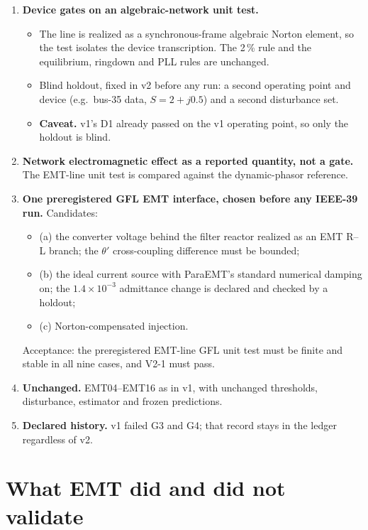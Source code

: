 \documentclass[10pt,a4paper]{article}
\begin{document}
\begin{enumerate}[label=V2-\arabic*.,leftmargin=3em]
\item \textbf{Device gates on an algebraic-network unit test.}
  \begin{itemize}
  \item The line is realized as a synchronous-frame algebraic Norton element,
    so the test isolates the device transcription. The 2\,\% rule and the
    equilibrium, ringdown and PLL rules are unchanged.
  \item Blind holdout, fixed in v2 before any run: a second operating point and
    device (e.g.\ bus-35 data, $S=2+j0.5$) and a second disturbance set.
  \item \textbf{Caveat.} v1's D1 already passed on the v1 operating point, so
    only the holdout is blind.
  \end{itemize}
\item \textbf{Network electromagnetic effect as a reported quantity, not a
  gate.} The EMT-line unit test is compared against the dynamic-phasor
  reference.
\item \textbf{One preregistered GFL EMT interface, chosen before any IEEE-39
  run.} Candidates:
  \begin{itemize}
  \item (a) the converter voltage behind the filter reactor realized as an EMT
    R--L branch; the $\theta'$ cross-coupling difference must be bounded;
  \item (b) the ideal current source with ParaEMT's standard numerical damping
    on; the $1.4\times10^{-3}$ admittance change is declared and checked by a
    holdout;
  \item (c) Norton-compensated injection.
  \end{itemize}
  Acceptance: the preregistered EMT-line GFL unit test must be finite and
  stable in all nine cases, and V2-1 must pass.
\item \textbf{Unchanged.} EMT04--EMT16 as in v1, with unchanged thresholds,
  disturbance, estimator and frozen predictions.
\item \textbf{Declared history.} v1 failed G3 and G4; that record stays in the
  ledger regardless of v2.
\end{enumerate}

\section*{What EMT did and did not validate}
\end{document}
